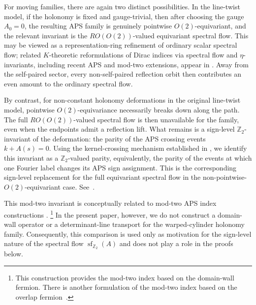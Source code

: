 \documentclass[11pt]{article}
\theoremstyle{definition}
\numberwithin{equation}{section}
\begin{document}
For moving families, there are again two distinct possibilities. In the line-twist model, if the holonomy is fixed and gauge-trivial, then after choosing the gauge \(A_0=0\), the resulting APS family is genuinely pointwise \(O(2)\)-equivariant, and the relevant invariant is the \(RO(O(2))\)-valued equivariant spectral flow. This may be viewed as a representation-ring refinement of ordinary scalar spectral flow; related \(K\)-theoretic reformulations of Dirac indices via spectral flow and \(\eta\)-invariants, including recent APS and mod-two extensions, appear in \cite{AokiFukayaFurutaMatsuoOnogiYamaguchi2024IndexKTheory, AokiFukayaFurutaMatsuoOnogiYamaguchi2025EtaWilsonIndex,AokiFujitaFukayaFurutaMatsuoOnogiYamaguchi2026CapturingAPS,AokiFujitaFukayaFurutaMatsuoOnogiYamaguchi2026Generalization}. Away from the self-paired sector, every non-self-paired reflection orbit then contributes an even amount to the ordinary spectral flow. 

By contrast, for non-constant holonomy deformations in the original line-twist model, pointwise \(O(2)\)-equivariance necessarily breaks down along the path. The full \(RO(O(2))\)-valued spectral flow is then unavailable for the family, even when the endpoints admit a reflection lift. What remains is a sign-level \(\mathbb Z_2\)-invariant of the deformation: the parity of the APS crossing events \(k+A(s)=0\). Using the kernel-crossing mechanism established in \cite{KS}, we identify this invariant as a \(\mathbb Z_2\)-valued parity, equivalently, the parity of the events at which one Fourier label changes its APS sign assignment. This is the corresponding sign-level replacement for the full equivariant spectral flow in the non-pointwise-\(O(2)\)-equivariant case. See~\cite{DollSchulzBaldesWaterstraat2019,NicolaescuOT}.

This mod-two invariant is conceptually related to mod-two APS index constructions \cite{FukayaFurutaMatsukiMatsuoOnogiYamaguchiYamashita2022}.%
\footnote{This construction provides the mod-two index based on the domain-wall fermion. There is another formulation of the mod-two index based on the overlap fermion~\cite{Clancy:2023ino,Kimura:2023kqs}.}
In the present paper, however, we do not construct a domain-wall operator or a determinant-line transport for the warped-cylinder holonomy family. Consequently, this comparison is used only as motivation for the sign-level nature of the spectral flow $\operatorname{sf}_{\mathbb Z_2}(A)$ and does not play a role in the proofs below.
\end{document}
